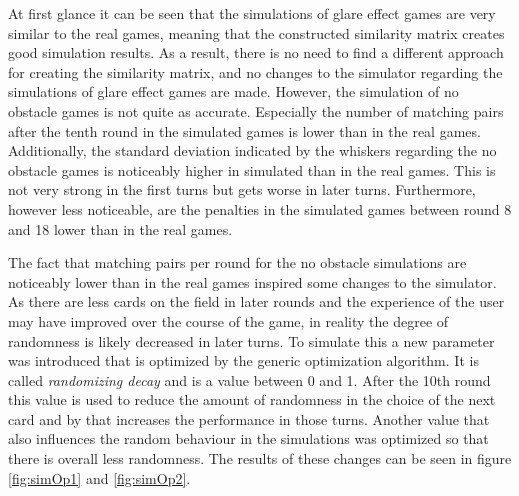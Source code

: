 At first glance it can be seen that the simulations of glare effect games are very similar to the real games, meaning that the constructed similarity matrix creates good simulation results. As a result, there is no need to find a different approach for creating the similarity matrix, and no changes to the simulator regarding the simulations of glare effect games are made. However, the simulation of no obstacle games is not quite as accurate. Especially the number of matching pairs after the tenth round in the simulated games is lower than in the real games. Additionally, the standard deviation indicated by the whiskers regarding the no obstacle games is noticeably higher in simulated than in the real games. This is not very strong in the first turns but gets worse in later turns. Furthermore, however less noticeable, are the penalties in the simulated games between round 8 and 18 lower than in the real games.

\newpage

The fact that matching pairs per round for the no obstacle simulations are noticeably lower than in the real games inspired some changes to the simulator. As there are less cards on the field in later rounds and the experience of the user may have improved over the course of the game, in reality the degree of randomness is likely decreased in later turns. To simulate this a new parameter was introduced that is optimized by the generic optimization algorithm. It is called \textit{randomizing decay} and is a value between 0 and 1. After the 10th round this value is used to reduce the amount of randomness in the choice of the next card and by that increases the performance in those turns. Another value that also influences the random behaviour in the simulations was optimized so that there is overall less randomness. The results of these changes can be seen in figure \ref{fig:simOp1} and \ref{fig:simOp2}. 


